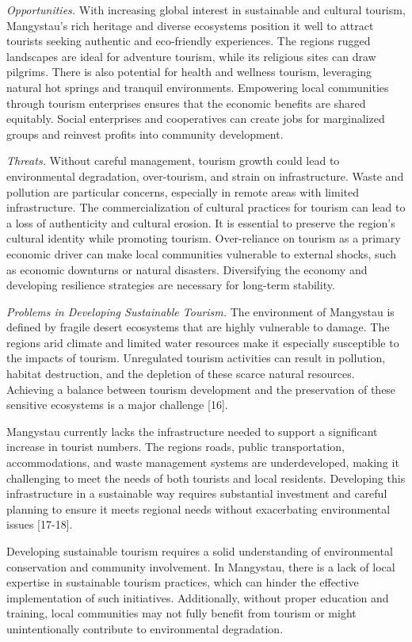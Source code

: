 \begin{multicols}{2}
\emph{Opportunities.} With increasing global interest in sustainable and
cultural tourism, Mangystau's rich heritage and diverse ecosystems
position it well to attract tourists seeking authentic and eco-friendly
experiences. The region\textquotesingle s rugged landscapes are ideal
for adventure tourism, while its religious sites can draw pilgrims.
There is also potential for health and wellness tourism, leveraging
natural hot springs and tranquil environments. Empowering local
communities through tourism enterprises ensures that the economic
benefits are shared equitably. Social enterprises and cooperatives can
create jobs for marginalized groups and reinvest profits into community
development.

\emph{Threats.} Without careful management, tourism growth could lead to
environmental degradation, over-tourism, and strain on infrastructure.
Waste and pollution are particular concerns, especially in remote areas
with limited infrastructure. The commercialization of cultural practices
for tourism can lead to a loss of authenticity and cultural erosion. It
is essential to preserve the region's cultural identity while promoting
tourism. Over-reliance on tourism as a primary economic driver can make
local communities vulnerable to external shocks, such as economic
downturns or natural disasters. Diversifying the economy and developing
resilience strategies are necessary for long-term stability.

\emph{Problems in Developing Sustainable Tourism.} The environment of
Mangystau is defined by fragile desert ecosystems that are highly
vulnerable to damage. The region\textquotesingle s arid climate and
limited water resources make it especially susceptible to the impacts of
tourism. Unregulated tourism activities can result in pollution, habitat
destruction, and the depletion of these scarce natural resources.
Achieving a balance between tourism development and the preservation of
these sensitive ecosystems is a major challenge {[}16{]}.

Mangystau currently lacks the infrastructure needed to support a
significant increase in tourist numbers. The region\textquotesingle s
roads, public transportation, accommodations, and waste management
systems are underdeveloped, making it challenging to meet the needs of
both tourists and local residents. Developing this infrastructure in a
sustainable way requires substantial investment and careful planning to
ensure it meets regional needs without exacerbating environmental issues
{[}17-18{]}.

Developing sustainable tourism requires a solid understanding of
environmental conservation and community involvement. In Mangystau,
there is a lack of local expertise in sustainable tourism practices,
which can hinder the effective implementation of such initiatives.
Additionally, without proper education and training, local communities
may not fully benefit from tourism or might unintentionally contribute
to environmental degradation.
\end{multicols}

